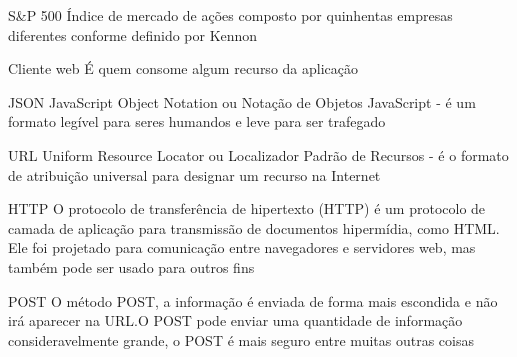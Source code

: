 \begin{siglas}
    \item[S\&P 500] Índice de mercado de ações composto por
                    quinhentas empresas diferentes conforme definido
                    por Kennon \cite{definicao-de-sp500}

    \item[Cliente web] É quem consome algum recurso da aplicação

    \item[JSON] JavaScript Object Notation ou Notação de Objetos JavaScript -
                é um formato legível para seres humandos e leve para ser trafegado \cite{define-json}

    \item[URL] Uniform Resource Locator ou Localizador Padrão de Recursos - é o formato de atribuição
               universal para designar um recurso na Internet \cite{define-url}
               
    \item[HTTP] O protocolo de transferência de hipertexto (HTTP) é um protocolo de camada de aplicação
               para transmissão de documentos hipermídia, como HTML. Ele foi projetado para comunicação
               entre navegadores e servidores web, mas também pode ser usado para outros fins \cite{define-http}
               
    \item[POST] O método POST, a informação é enviada de forma mais escondida e não irá aparecer na URL.O POST
                pode enviar uma quantidade de informação consideravelmente grande, o POST é mais seguro entre 
                muitas outras coisas \cite{define-post}
\end{siglas}
